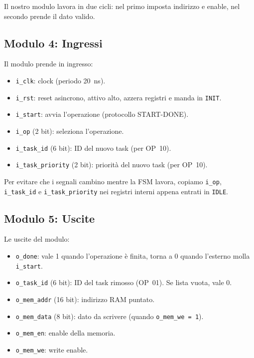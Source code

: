 \documentclass[a4paper,12pt]{article}
\begin{document}
Il nostro modulo lavora in due cicli: nel primo imposta indirizzo e enable, nel secondo prende il dato valido.

\subsection{Modulo 4: Ingressi}

Il modulo prende in ingresso:

\begin{itemize}
    \item \texttt{i\_clk}: clock (periodo 20~ns).
    \item \texttt{i\_rst}: reset asincrono, attivo alto, azzera registri e manda in \texttt{INIT}.
    \item \texttt{i\_start}: avvia l'operazione (protocollo START-DONE).
    \item \texttt{i\_op} (2 bit): seleziona l'operazione.
    \item \texttt{i\_task\_id} (6 bit): ID del nuovo task (per OP~10).
    \item \texttt{i\_task\_priority} (2 bit): priorità del nuovo task (per OP~10).
\end{itemize}

Per evitare che i segnali cambino mentre la FSM lavora, copiamo \texttt{i\_op}, \texttt{i\_task\_id} e \texttt{i\_task\_priority} nei registri interni appena entrati in \texttt{IDLE}.

\subsection{Modulo 5: Uscite}

Le uscite del modulo:

\begin{itemize}
    \item \texttt{o\_done}: vale 1 quando l'operazione è finita, torna a 0 quando l'esterno molla \texttt{i\_start}.
    \item \texttt{o\_task\_id} (6 bit): ID del task rimosso (OP~01). Se lista vuota, vale 0.
    \item \texttt{o\_mem\_addr} (16 bit): indirizzo RAM puntato.
    \item \texttt{o\_mem\_data} (8 bit): dato da scrivere (quando \texttt{o\_mem\_we = 1}).
    \item \texttt{o\_mem\_en}: enable della memoria.
    \item \texttt{o\_mem\_we}: write enable.
\end{itemize}
\end{document}
